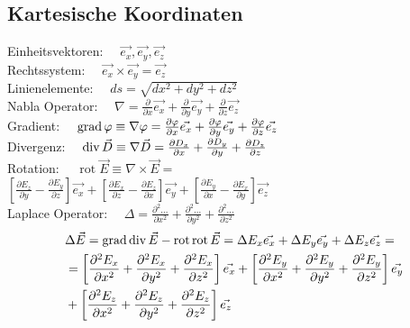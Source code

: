\subsection{Kartesische Koordinaten}
Einheitsvektoren:   $\quad \vec{e_{x}}, \vec{e_{y}}, \vec{e_{z}}$\\ 
Rechtssystem:       $\quad \vec{e_{x}} \times \vec{e_{y}}=\vec{e_{z}}$\\
Linienelemente:     $\quad d s=\sqrt{d x^{2}+d y^{2}+d z^{2}}$\\
Nabla Operator:     $\quad \nabla=\frac{\partial}{\partial x} \vec{e_{x}}+\frac{\partial}{\partial y} \vec{e_{y}}+\frac{\partial}{\partial z} \vec{e_{z}}$\\
Gradient:           $\quad \operatorname{grad} \varphi \equiv \nabla \varphi=\frac{\partial \varphi}{\partial x} \vec{e_{x}}+\frac{\partial \varphi}{\partial y} \vec{e_{y}}+\frac{\partial \varphi}{\partial z} \vec{e_{z}}$\\
Divergenz:          $\quad \operatorname{div} \vec{D} \equiv \nabla \vec{D}=\frac{\partial D_{x}}{\partial x}+\frac{\partial D_{y}}{\partial y}+\frac{\partial D_{z}}{\partial z}$\\
Rotation:           $\quad \operatorname{rot} \vec{E} \equiv \nabla \times \vec{E} =$\\
                        $\left[\frac{\partial E_{z}}{\partial y}-\frac{\partial E_{y}}{\partial z}\right] \vec{e_{x}}+\left[\frac{\partial E_{x}}{\partial z}-\frac{\partial E_{z}}{\partial x}\right] \vec{e_{y}}+\left[\frac{\partial E_{y}}{\partial x}-\frac{\partial E_{x}}{\partial y}\right] \vec{e_{z}}$\\
Laplace Operator:   $\quad \Delta=\frac{\partial^{2} \ldots}{\partial x^{2}}+\frac{\partial^{2} \ldots}{\partial y^{2}}+\frac{\partial^{2} \ldots}{\partial z^{2}}$\\
\begin{align*}
    &\Delta \vec{E} = \operatorname{grad} \operatorname{div} \vec{E}-\operatorname{rot} \operatorname{rot} \vec{E} =\Delta E_{x} \vec{e_{x}}+\Delta E_{y} \vec{e_{y}}+\Delta E_{z} \vec{e_{z}}=\\
                   &= \left[\frac{\partial^{2} E_{x}}{\partial x^{2}}+\frac{\partial^{2} E_{x}}{\partial y^{2}}+\frac{\partial^{2} E_{x}}{\partial z^{2}}\right] \vec{e_{x}}+\left[\frac{\partial^{2} E_{y}}{\partial x^{2}}+\frac{\partial^{2} E_{y}}{\partial y^{2}}+\frac{\partial^{2} E_{y}}{\partial z^{2}}\right] \vec{e_{y}}\\
                   &+ \left[\frac{\partial^{2} E_{z}}{\partial x^{2}}+\frac{\partial^{2} E_{z}}{\partial y^{2}}+\frac{\partial^{2} E_{z}}{\partial z^{2}}\right] \vec{e_{z}}
\end{align*}

